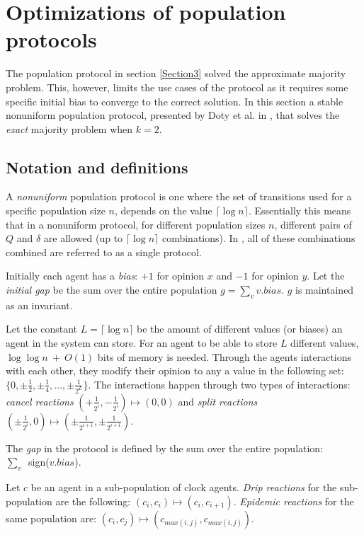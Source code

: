 \section{Optimizations of population protocols}
The population protocol in section \ref{Section3} solved the approximate majority problem. This, however, limits the use cases of the protocol as it requires some specific initial bias to converge to the correct solution.  In this section a stable nonuniform population protocol, presented by Doty et al. in \cite{dotyTimeSpaceOptimal2022}, that solves the \emph{exact} majority problem when $k = 2$. 

\subsection{Notation and definitions}

A \emph{nonuniform} population protocol is one where the set of transitions used for a specific population size $n$, depends on the value $\lceil \log n \rceil$. Essentially this means that in a nonuniform protocol, for different population sizes $n$, different pairs of $Q$ and $\delta$ are allowed (up to $\lceil \log n \rceil$ combinations). In \cite{dotyTimeSpaceOptimal2022}, all of these combinations combined are referred to as a single protocol. 

Initially each agent has a \emph{bias}: $+1$ for opinion $x$ and $-1$ for opinion $y$. Let the \emph{initial gap} be the sum over the entire population $g = \sum_v v.bias$. $g$ is maintained as an invariant. 

Let the constant $L = \lceil \log n \rceil$ be the amount of different values (or biases) an agent in the system can store. For an agent to be able to store $L$ different values, $\log \log n \ + \ O(1)$ bits of memory is needed. Through the agents interactions with each other, they modify their opinion to any a value in the following set: $\{ 0, \pm \frac{1}{2}, \pm \frac{1}{4}, ...,  \pm \frac{1}{2^L} \}$. The interactions happen through two types of interactions: \emph{cancel reactions} $(+\frac{1}{2^i}, -\frac{1}{2^i}) \mapsto (0, 0)$ and \emph{split reactions} $(\pm \frac{1}{2^i}, 0) \mapsto (\pm \frac{1}{2^{i + 1}}, \pm \frac{1}{2^{i + 1}})$.

The \emph{gap} in the protocol is defined by the sum over the entire population: \\ \mbox{$\sum_v$ sign($v.bias$)}.

Let $c$ be an agent in a sub-population of clock agents. \emph{Drip reactions} for the sub-population are the following: $(c_i, c_i) \mapsto (c_i, c_{i + 1})$. \emph{Epidemic reactions} for the same population are: $(c_i, c_j) \mapsto (c_{max(i, j)}, c_{max(i, j)})$.

